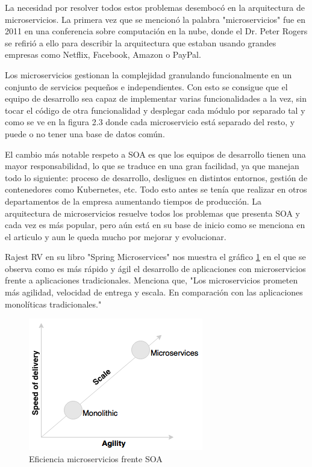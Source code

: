 \documentclass[12pt]{report} %
\begin{document}
La necesidad por resolver todos estos problemas desembocó en la arquitectura de microservicios. La primera vez que se mencionó la palabra "microservicios" fue en 2011 en una conferencia sobre computación en la nube, donde el Dr. Peter Rogers\cite{breveHistoria} se refirió a ello para describir la arquitectura que estaban usando grandes empresas como Netflix, Facebook, Amazon o PayPal. 

Los microservicios gestionan la complejidad granulando funcionalmente en un conjunto de servicios pequeños e independientes. Con esto se consigue que el equipo de desarrollo sea capaz de implementar varias funcionalidades a la vez, sin tocar el código de otra  funcionalidad y desplegar cada módulo por separado tal y como se ve en la figura 2.3 donde cada microservicio está separado del resto, y puede o no tener una base de datos común.

El cambio más notable respeto a SOA es que los equipos de desarrollo tienen una mayor responsabilidad, lo que se traduce en una gran facilidad, ya que manejan todo lo siguiente:  proceso de desarrollo, desligues en distintos entornos, gestión de contenedores como Kubernetes, etc. Todo esto antes se tenía que realizar en otros departamentos de la empresa aumentando tiempos de producción. La arquitectura de microservicios resuelve todos los problemas que presenta SOA y cada vez es más popular, pero aún está en su base de inicio como se menciona en el articulo\cite{Dragoni2017} y aun le queda mucho por mejorar y evolucionar.
 
 
 
Rajest RV en su libro "Spring Microservices"\cite{rv2016spring} nos muestra el gráfico \ref{fig:desarrollomonovsmicro} en el que se observa como es más rápido y ágil el desarrollo de aplicaciones con microservicios frente a aplicaciones tradicionales. Menciona que, "Los microservicios prometen más agilidad, velocidad de entrega y escala. En comparación con las aplicaciones monolíticas tradicionales." 

\begin{figure}
	\centering
	\includegraphics[width=0.7\linewidth]{imagenes/desarrolloMonovsMicro}
	\caption{Eficiencia microservicios frente SOA}
	\label{fig:desarrollomonovsmicro}
\end{figure}
\end{document}
